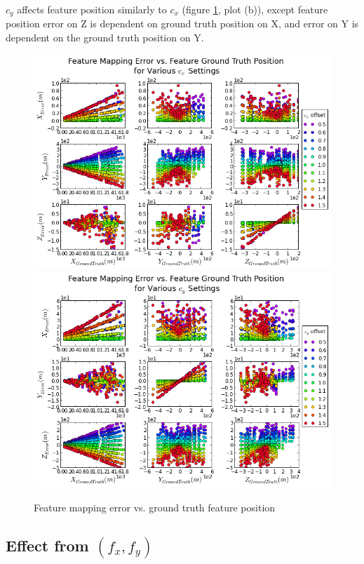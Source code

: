 $c_{y}$ affects feature position similarly to $c_{x}$ (figure
\ref{fig:simfig32-33}, plot (b)), except feature position error on Z
is dependent on ground truth position on X, and error on Y is
dependent on the ground truth position on Y.

\begin{figure}[h]
  \centering
  \includegraphics[scale=0.5]{./Figures/SimulationFigures/Figure32.png}
  \includegraphics[scale=0.5]{./Figures/SimulationFigures/Figure33.png}
  \caption{Feature mapping error vs. ground truth feature position}
  \label{fig:simfig32-33}
\end{figure}

\subsection{Effect from $(f_x, f_y)$}

